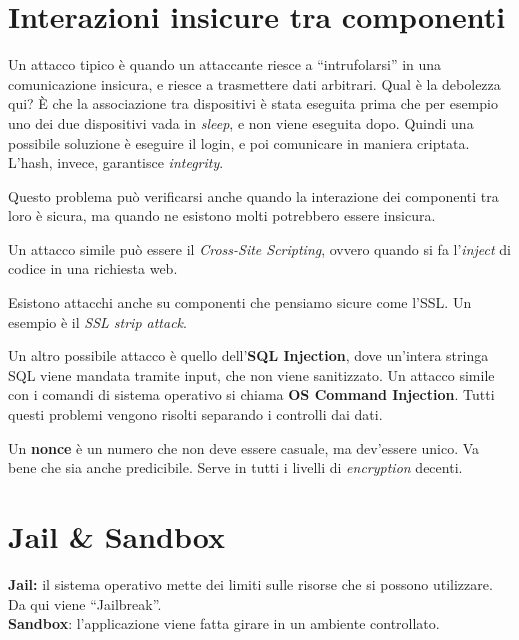 \section{Interazioni insicure tra componenti}

Un attacco tipico è quando un attaccante riesce a ``intrufolarsi'' in una
comunicazione insicura, e riesce a trasmettere dati arbitrari.
Qual è la debolezza qui? È che la associazione tra dispositivi è stata eseguita
prima che per esempio uno dei due dispositivi vada in \textit{sleep}, e non
viene eseguita dopo. Quindi una possibile soluzione è eseguire il login, e poi
comunicare in maniera criptata. L'hash, invece, garantisce \textit{integrity}.

Questo problema può verificarsi anche quando la interazione dei componenti tra
loro è sicura, ma quando ne esistono molti potrebbero essere insicura.

Un attacco simile può essere il \textit{Cross-Site Scripting}, ovvero quando si
fa l'\textit{inject} di codice in una richiesta web.

Esistono attacchi anche su componenti che pensiamo sicure come l'SSL. Un
esempio è il \textit{SSL strip attack}.

Un altro possibile attacco è quello dell'\textbf{SQL Injection}, dove un'intera
stringa SQL viene mandata tramite input, che non viene sanitizzato. Un attacco
simile con i comandi di sistema operativo si chiama \textbf{OS Command
Injection}. Tutti questi problemi vengono risolti separando i controlli dai
dati.

Un \textbf{nonce} è un numero che non deve essere casuale, ma dev'essere unico.
Va bene che sia anche predicibile. Serve in tutti i livelli di
\textit{encryption} decenti.

\section{Jail \& Sandbox}

\textbf{Jail:} il sistema operativo mette dei limiti sulle risorse che si
possono utilizzare.
Da qui viene ``Jailbreak''.\\
\newline
\textbf{Sandbox}: l'applicazione viene fatta girare in un ambiente controllato.